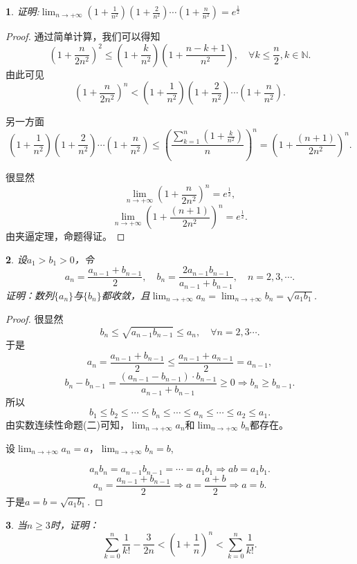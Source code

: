 \documentclass[utf8]{book}
\newtheorem{example}{}[section]             %
\begin{document}
\begin{example}
证明:$\displaystyle\lim_{n\to +\infty}\left(1+\frac{1}{n^2}\right)\left(1+\frac{2}{n^2}\right)\cdots\left(1+\frac{n}{n^2}\right)=e^{\frac{1}{2}}$
\end{example}
\begin{proof}
通过简单计算，我们可以得知
$$\left(1+\frac{n}{2n^2}\right)^2 \leq \left(1+\frac{k}{n^2}\right)\left(1+\frac{n-k+1}{n^2}\right), \quad\forall k \leq \frac{n}{2}, k\in\mathbb{N}.$$
由此可见
$$\left(1+\frac{n}{2n^2}\right)^n < \left(1+\frac{1}{n^2}\right)\left(1+\frac{2}{n^2}\right)\cdots\left(1+\frac{n}{n^2}\right).$$

另一方面
$$\left(1+\frac{1}{n^2}\right)\left(1+\frac{2}{n^2}\right)\cdots\left(1+\frac{n}{n^2}\right) \leq \left(\frac{\displaystyle\sum_{k=1}^{n}\left(1+\frac{k}{n^2}\right)}{n}\right)^n=\left(1+\frac{(n+1)}{2n^2}\right)^n.$$

很显然
$$\displaystyle\lim_{n\to +\infty}\left(1+\frac{n}{2n^2}\right)^n=e^{\frac{1}{2}},$$
$$\displaystyle\lim_{n\to +\infty}\left(1+\frac{(n+1)}{2n^2}\right)^n=e^{\frac{1}{2}}.$$
由夹逼定理，命题得证。
\end{proof}
\begin{example}
设$a_1>b_1>0$，令$$a_n=\displaystyle\frac{a_{n-1}+b_{n-1}}{2},\quad b_n=\frac{2a_{n-1}b_{n-1}}{a_{n-1}+b_{n-1}}, \quad n = 2,3,\cdots.$$ 证明：数列$\{a_n\}$与$\{b_n\}$都收敛，且$\displaystyle\lim_{n\to +\infty}a_n=\displaystyle\lim_{n\to +\infty}b_n=\sqrt{a_1b_1}$.
\end{example}
\begin{proof}很显然
$$b_n \leq \sqrt{a_{n-1}b_{n-1}}\leq a_n,\quad\forall n = 2,3\cdots.$$
于是
$$a_n =\displaystyle\frac{a_{n-1}+b_{n-1}}{2} \leq \displaystyle\frac{a_{n-1}+a_{n-1}}{2} = a_{n-1},$$
$$b_n -b_{n-1} = \frac{(a_{n-1}-b_{n-1})\cdot b_{n-1}}{a_{n-1}+b_{n-1}} \geq 0\Rightarrow b_n \geq b_{n-1}.$$
所以
$$b_1 \leq b_2\leq \cdots \leq b_n \leq \cdots \leq a_n \leq \cdots \leq a_2\leq a_1.$$
由实数连续性命题(二)可知，$\displaystyle\lim_{n\to +\infty}a_n$和$\displaystyle\lim_{n\to +\infty}b_n$都存在。 

设$\displaystyle\lim_{n\to +\infty}a_n=a$，$\displaystyle\lim_{n\to +\infty}b_n=b$,

$$a_nb_n=a_{n-1}b_{n-1}=\cdots = a_1b_1\Rightarrow ab = a_1b_1.$$
$$a_n=\displaystyle\frac{a_{n-1}+b_{n-1}}{2}\Rightarrow a=\frac{a+b}{2}\Rightarrow a=b.$$
于是$a=b=\sqrt{a_1b_1}$.
\end{proof}
\begin{example}
当$n\geq 3$时，证明：
$$\displaystyle\sum_{k=0}^n\frac{1}{k!}-\frac{3}{2n}<\left(1+\frac{1}{n}\right)^n < \displaystyle\sum_{k=0}^n\frac{1}{k!}.$$
\end{example}
\end{document}
